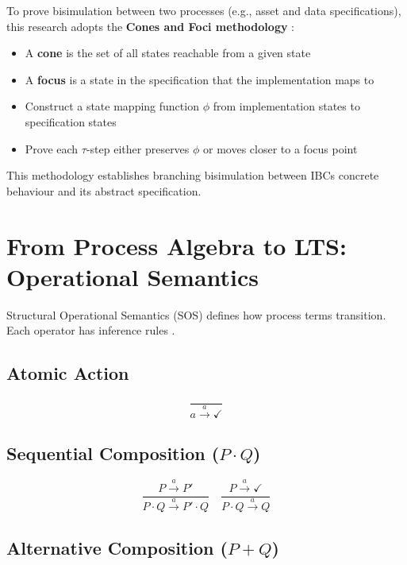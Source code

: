 To prove bisimulation between two processes (e.g., asset and data
specifications), this research adopts the
\textbf{Cones and Foci methodology} \cite{Fokkink2004}:

\begin{itemize}
    \item A \textbf{cone} is the set of all states reachable from a given state
    \item A \textbf{focus} is a state in the specification that the implementation maps to
    \item Construct a state mapping function \(\phi\) from implementation states to specification states
    \item Prove each \(\tau\)-step either preserves \(\phi\) or moves closer to a focus point
\end{itemize}

This methodology establishes branching bisimulation between
IBC\textquotesingle s concrete behaviour and its abstract specification.

\section{From Process Algebra to LTS: Operational
Semantics}\label{from-process-algebra-to-lts-operational-semantics}

Structural Operational Semantics (SOS) defines how process terms
transition. Each operator has inference rules \citep{Vaandrager_1990}.

\subsection{Atomic Action}\label{atomic-action}

\[
\frac{}{a \xrightarrow{a} \checkmark}
\]

\subsection{\texorpdfstring{Sequential Composition
(\(P \cdot Q\))}{Sequential Composition (P \textbackslash cdot Q)}}\label{sequential-composition-p-cdot-q}

\[
\frac{P \xrightarrow{a} P'}{P \cdot Q \xrightarrow{a} P' \cdot Q} \quad
\frac{P \xrightarrow{a} \checkmark}{P \cdot Q \xrightarrow{a} Q}
\]

\subsection{\texorpdfstring{Alternative Composition
(\(P + Q\))}{Alternative Composition (P + Q)}}\label{alternative-composition-p-q}

